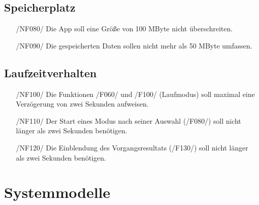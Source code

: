 \documentclass[a4paper,12pt]{article}
\begin{document}
\subsection{Speicherplatz}
\begin{itemize}
  \item[/NF080/] Die App soll eine Größe von 100 MByte nicht überschreiten. %
  \item[/NF090/] Die gespeicherten Daten sollen nicht mehr als 50 MByte umfassen. %
\end{itemize}
\subsection{Laufzeitverhalten}
\begin{itemize}
  \item[/NF100/] Die Funktionen /F060/ und /F100/ (Laufmodus) soll maximal eine Verzögerung von zwei Sekunden aufweisen. %
  \item[/NF110/] Der Start eines Modus nach seiner Auswahl (/F080/) soll nicht länger als zwei Sekunden benötigen. %
  \item[/NF120/] Die Einblendung des Vorgangsresultats (/F130/) soll nicht länger als zwei Sekunden benötigen.%

\end{itemize}
\section{Systemmodelle}
\end{document}

